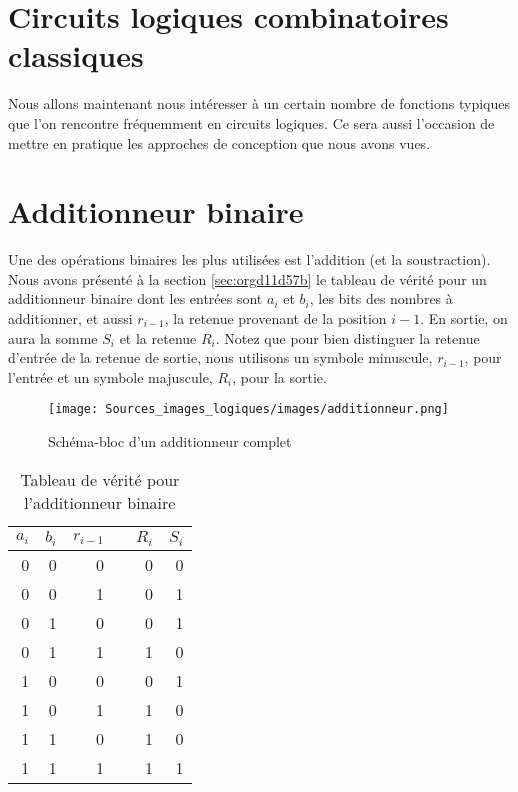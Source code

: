 \documentclass[letter, oneside]{book}
\begin{document}
\section{Circuits logiques combinatoires classiques}
\label{sec:org1f17f2b}

Nous allons maintenant nous intéresser à un certain nombre de
fonctions typiques que l'on rencontre fréquemment en circuits
logiques. Ce sera aussi l'occasion de mettre en pratique les approches
de conception que nous avons vues.


\section{Additionneur binaire}
\label{sec:org03465a7}

Une des opérations binaires les plus utilisées est l'addition (et la
soustraction). Nous avons présenté à la section \ref{sec:orgd11d57b} le tableau de vérité pour un additionneur binaire dont les
entrées sont \(a_{i}\) et \(b_{i}\), les bits des nombres à
additionner, et aussi \(r_{i-1}\), la retenue provenant de la position
\(i-1\). En sortie, on aura la somme \(S_{i}\) et la retenue
\(R_{i}\). Notez que pour bien distinguer la retenue d'entrée de la
retenue de sortie, nous utilisons un symbole minuscule, \(r_{i-1}\),
pour l'entrée et un symbole majuscule, \(R_{i}\), pour la sortie. 

\begin{figure}[htbp]
\centering
\texttt{[image: Sources\_images\_logiques/images/additionneur.png]}
\caption{\label{fig:org192fc00}Schéma-bloc d'un additionneur complet}
\end{figure}

\begin{table}[htbp]
\caption{\label{tab:orgc0801fb}Tableau de vérité pour l'additionneur binaire}
\centering
\begin{tabular}{rrrlrr}
\(a_{i}\) & \(b_{i}\) & \(r_{i-1}\) &  & \(R_{i}\) & \(S_{i}\)\\[0pt]
\hline
0 & 0 & 0 &  & 0 & 0\\[0pt]
0 & 0 & 1 &  & 0 & 1\\[0pt]
0 & 1 & 0 &  & 0 & 1\\[0pt]
0 & 1 & 1 &  & 1 & 0\\[0pt]
1 & 0 & 0 &  & 0 & 1\\[0pt]
1 & 0 & 1 &  & 1 & 0\\[0pt]
1 & 1 & 0 &  & 1 & 0\\[0pt]
1 & 1 & 1 &  & 1 & 1\\[0pt]
\end{tabular}
\end{table}
\end{document}

